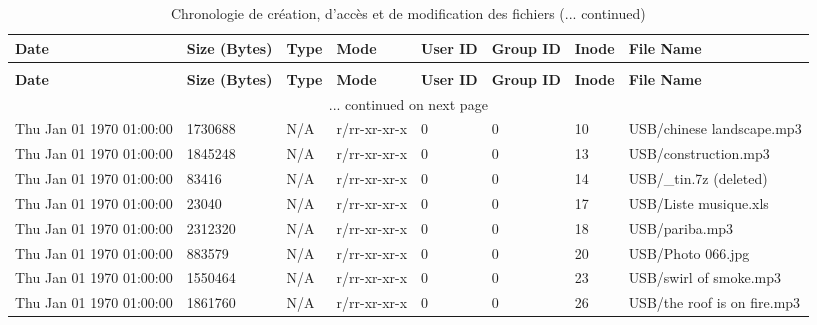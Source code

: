 \setlength{\DUtablewidth}{\linewidth}
\begin{longtable}[c]{|p{0.121\DUtablewidth}|p{0.1\DUtablewidth}|p{0.08\DUtablewidth}|p{0.12\DUtablewidth}|p{0.06\DUtablewidth}|p{0.06\DUtablewidth}|p{0.06\DUtablewidth}|p{0.2\DUtablewidth}|}
\caption{Chronologie de création, d'accès et de modification des fichiers}\\
\hline
\textbf{%
Date
} & \textbf{%
Size (Bytes)
} & \textbf{%
Type
} & \textbf{%
Mode
} & \textbf{%
User ID
} & \textbf{%
Group ID
} & \textbf{%
Inode
} & \textbf{%
File Name
} \\
\hline
\endfirsthead
\caption[]{Chronologie de création, d'accès et de modification des fichiers (... continued)}\\
\hline
\textbf{%
Date
} & \textbf{%
Size (Bytes)
} & \textbf{%
Type
} & \textbf{%
Mode
} & \textbf{%
User ID
} & \textbf{%
Group ID
} & \textbf{%
Inode
} & \textbf{%
File Name
} \\
\hline
\endhead
\multicolumn{8}{c}{\hfill ... continued on next page} \\
\endfoot
\endlastfoot

Thu Jan 01 1970 01:00:00
 & 
1730688
 & 
N/A
 & 
r/rr-xr-xr-x
 & 
0
 & 
0
 & 
10
 & 
USB/chinese landscape.mp3
 \\
\hline

Thu Jan 01 1970 01:00:00
 & 
1845248
 & 
N/A
 & 
r/rr-xr-xr-x
 & 
0
 & 
0
 & 
13
 & 
USB/construction.mp3
 \\
\hline

Thu Jan 01 1970 01:00:00
 & 
83416
 & 
N/A
 & 
r/rr-xr-xr-x
 & 
0
 & 
0
 & 
14
 & 
USB/\_tin.7z (deleted)
 \\
\hline

Thu Jan 01 1970 01:00:00
 & 
23040
 & 
N/A
 & 
r/rr-xr-xr-x
 & 
0
 & 
0
 & 
17
 & 
USB/Liste musique.xls
 \\
\hline

Thu Jan 01 1970 01:00:00
 & 
2312320
 & 
N/A
 & 
r/rr-xr-xr-x
 & 
0
 & 
0
 & 
18
 & 
USB/pariba.mp3
 \\
\hline

Thu Jan 01 1970 01:00:00
 & 
883579
 & 
N/A
 & 
r/rr-xr-xr-x
 & 
0
 & 
0
 & 
20
 & 
USB/Photo 066.jpg
 \\
\hline

Thu Jan 01 1970 01:00:00
 & 
1550464
 & 
N/A
 & 
r/rr-xr-xr-x
 & 
0
 & 
0
 & 
23
 & 
USB/swirl of smoke.mp3
 \\
\hline

Thu Jan 01 1970 01:00:00
 & 
1861760
 & 
N/A
 & 
r/rr-xr-xr-x
 & 
0
 & 
0
 & 
26
 & 
USB/the roof is on fire.mp3
 \\
\hline


\end{longtable}
